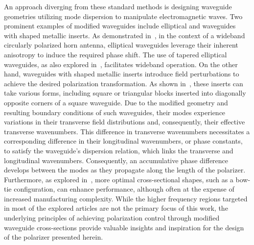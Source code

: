 \documentclass[11pt,a4paper,twoside,openany]{report}
\begin{document}
An approach diverging from these standard methods is designing waveguide geometries utilizing mode dispersion to manipulate electromagnetic waves. Two prominent examples of modified waveguides include elliptical and waveguides with shaped metallic inserts. As demonstrated in~\parencite{yu-et-al:a-wideband-circularly-polarized-horn-antenna-with-a-tapered-elliptical-waveguide-polarizer}, in the context of a wideband circularly polarized horn antenna, elliptical waveguides leverage their inherent anisotropy to induce the required phase shift. The use of tapered elliptical waveguides, as also explored in~\parencite{yu-et-al:a-wideband-circularly-polarized-horn-antenna-with-a-tapered-elliptical-waveguide-polarizer}, facilitates wideband operation. On the other hand, waveguides with shaped metallic inserts introduce field perturbations to achieve the desired polarization transformation. As shown in~\parencite{rud-shpachenko:polarizers-on-sections-of-square-waveguides-with-inner-corner-ridges,bhardwaj-volakis:hexagonal-waveguides-new-class-of-waveguides-for-mmwave-circularly-polarized-horns,bhardwaj-volakis:hexagonal-waveguide-based-circularly-polarized-horn-antennas-for-submmwave-terahertz-band,bhardwaj-volakis:circularly-polarized-horn-antennas-for-terahertz-communications-using-differential-mode-dispersion-in-hexagonal-waveguides}, these inserts can take various forms, including square or triangular blocks inserted into diagonally opposite corners of a square waveguide. Due to the modified geometry and resulting boundary conditions of such waveguides, their modes experience variations in their transverse field distributions and, consequently, their effective transverse wavenumbers. This difference in transverse wavenumbers necessitates a corresponding difference in their longitudinal wavenumbers, or phase constants, to satisfy the waveguide's dispersion relation, which links the transverse and longitudinal wavenumbers. Consequently, an accumulative phase difference develops between the modes as they propagate along the length of the polarizer. Furthermore, as explored in~\parencite{garcia-marin-masa-campos:bowtie-shaped-radiating-element-for-single-and-dual-circular-polarization}, more optimal cross-sectional shapes, such as a bow-tie configuration, can enhance performance, although often at the expense of increased manufacturing complexity. While the higher frequency regions targeted in most of the explored articles are not the primary focus of this work, the underlying principles of achieving polarization control through modified waveguide cross-sections provide valuable insights and inspiration for the design of the polarizer presented herein.
\end{document}
